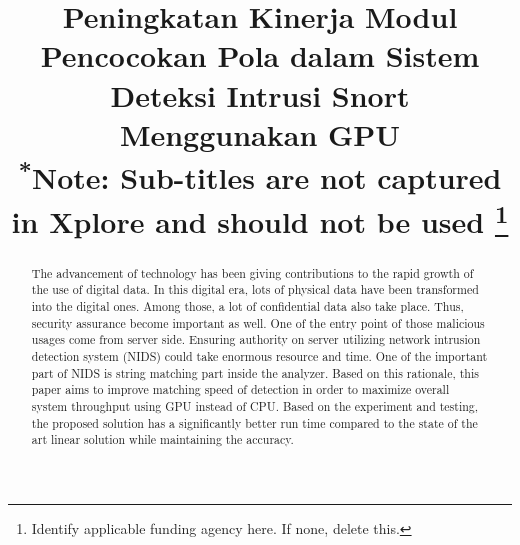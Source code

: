 \documentclass[conference]{IEEEtran}
\begin{document}
\title{Peningkatan Kinerja Modul Pencocokan Pola dalam Sistem Deteksi Intrusi Snort Menggunakan GPU\\
{\footnotesize \textsuperscript{*}Note: Sub-titles are not captured in Xplore and
should not be used}
\thanks{Identify applicable funding agency here. If none, delete this.}
}

\author{
\and
{}
}

\maketitle

\begin{abstract}

    The advancement of technology has been giving contributions to the rapid growth of the use of digital data. In this digital era, lots of physical data have been transformed into the digital ones. Among those, a lot of confidential data also take place. Thus, security assurance become important as well. One of the entry point of those malicious usages come from server side. Ensuring authority on server utilizing network intrusion detection system (NIDS) could take enormous resource and time. One of the important part of NIDS is string matching part inside the analyzer. Based on this rationale, this paper aims to improve matching speed of detection in order to maximize overall system throughput using GPU instead of CPU. Based on the experiment and testing, the proposed solution has a significantly better run time compared to the state of the art linear solution while maintaining the accuracy. 
\end{abstract}
\end{document}
